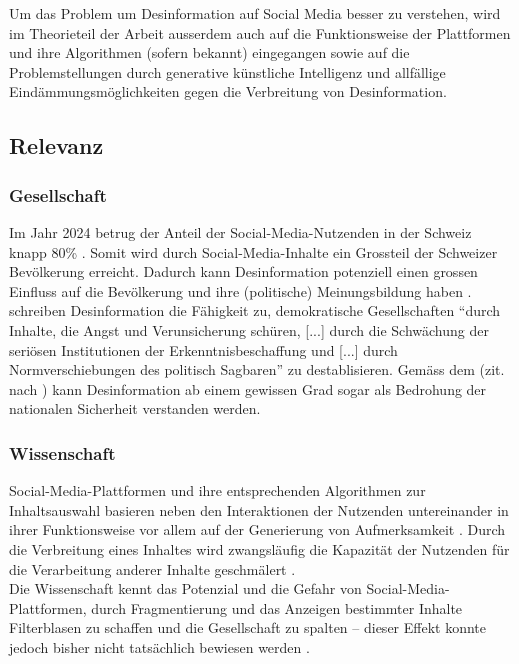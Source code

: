 \documentclass[12pt,a4paper]{article}        %
\begin{document}
Um das Problem um Desinformation auf Social Media besser zu verstehen, wird im Theorieteil der Arbeit ausserdem auch auf die Funktionsweise der Plattformen und ihre Algorithmen (sofern bekannt) eingegangen sowie auf die Problemstellungen durch generative künstliche Intelligenz und allfällige Eindämmungsmöglichkeiten gegen die Verbreitung von Desinformation.

\subsection{Relevanz}

\subsubsection{Gesellschaft}
Im Jahr 2024 betrug der Anteil der Social-Media-Nutzenden in der Schweiz knapp 80\% \parencite[22]{we_are_social_anteil_2024}. Somit wird durch Social-Media-Inhalte ein Grossteil der Schweizer Bevölkerung erreicht. Dadurch kann Desinformation potenziell einen grossen Einfluss auf die Bevölkerung und ihre (politische) Meinungsbildung haben \parencites[18]{grujic_warnhinweise_2024}[258]{hohlfeld_schlechte_2020}[1]{khan_fake_2021}. \\
\textcite[258]{hohlfeld_schlechte_2020} schreiben Desinformation die Fähigkeit zu, demokratische Gesellschaften “durch Inhalte, die Angst und Verunsicherung schüren, [...] durch die Schwächung der seriösen Institutionen der Erkenntnisbeschaffung und [...] durch Normverschiebungen des politisch Sagbaren” zu destablisieren. Gemäss dem \textcite{bundesministerium_des_innern_und_fur_heimat_desinformation_2022} (zit. nach \textcite[15]{teetz_social-media-post_2023}) kann Desinformation ab einem gewissen Grad sogar als Bedrohung der nationalen Sicherheit verstanden werden.

\subsubsection{Wissenschaft}
Social-Media-Plattformen und ihre entsprechenden Algorithmen zur Inhaltsauswahl basieren neben den Interaktionen der Nutzenden untereinander in ihrer Funktionsweise vor allem auf der Generierung von Aufmerksamkeit \parencites[vgl.][220]{schmidt_meinungsbildung_2022}[493]{behnke_manipulation_2018}. Durch die Verbreitung eines Inhaltes wird zwangsläufig die Kapazität der Nutzenden für die Verarbeitung anderer Inhalte geschmälert \parencite[248]{hohlfeld_schlechte_2020}. \\
Die Wissenschaft kennt das Potenzial und die Gefahr von Social-Media-Plattformen, durch Fragmentierung und das Anzeigen bestimmter Inhalte Filterblasen zu schaffen und die Gesellschaft zu spalten – dieser Effekt konnte jedoch bisher nicht tatsächlich bewiesen werden \parencite[220]{schmidt_meinungsbildung_2022}.\\
\end{document}
